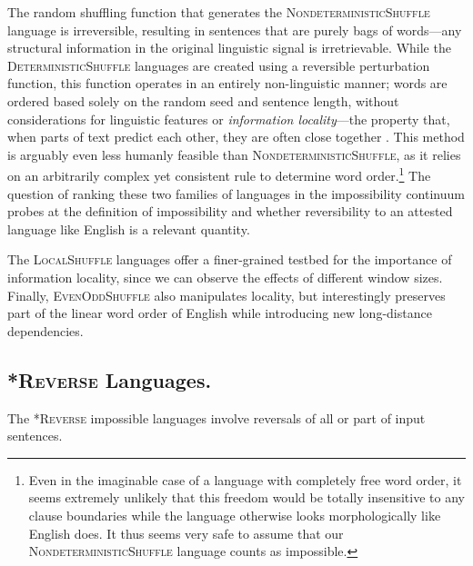 \documentclass[11pt]{article}
\begin{document}
\vspace{6pt}
\noindent
The random shuffling function that generates the \textsc{NondeterministicShuffle} language is irreversible, resulting in sentences that are purely bags of words---any structural information in the original linguistic signal is irretrievable. 
While the \textsc{DeterministicShuffle} languages are created using a reversible perturbation function, this function operates in an entirely non-linguistic manner; words are ordered based solely on the random seed and sentence length, without considerations for linguistic features or \emph{information locality}---the property that, when parts of text predict each other, they are often close together \citep{futrell-2019-information,mansfield2023emergence}. This method is arguably even less humanly feasible than \textsc{NondeterministicShuffle}, as it relies on an arbitrarily complex yet consistent rule to determine word order.\footnote{Even in the imaginable case of a language with completely free word order, it seems extremely unlikely that this freedom would be totally insensitive to any clause boundaries while the language otherwise looks morphologically like English does. It thus seems very safe to assume that our \textsc{NondeterministicShuffle} language counts as impossible.} 
The question of ranking these two families of languages in the impossibility continuum probes at the definition of impossibility and whether reversibility to an attested language like English is a relevant quantity.

The \textsc{LocalShuffle} languages offer a finer-grained testbed for the importance of information locality, since we can observe the effects of different window sizes. Finally, \textsc{EvenOddShuffle} also manipulates locality, but interestingly preserves part of the linear word order of English while introducing new long-distance dependencies.

\subsection{\textsc{*Reverse} Languages.}

The \textsc{*Reverse} impossible languages involve reversals of all or part of input sentences.
\end{document}
